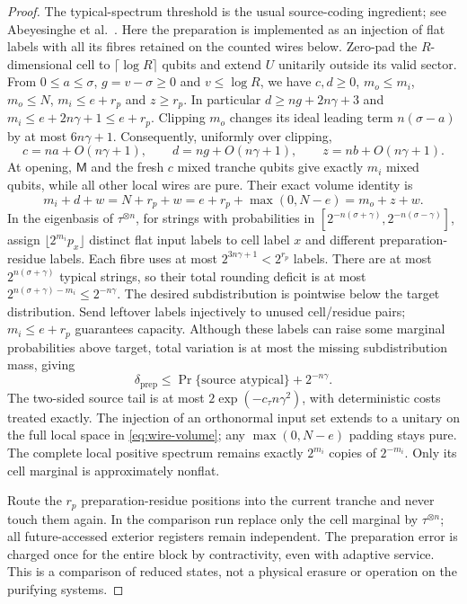 \documentclass[11pt,a4paper]{article}
\numberwithin{equation}{section}
\theoremstyle{plain}
\theoremstyle{definition}
\newcommand{\rg}[1]{\mathsf{#1}}
\begin{document}
\begin{proof}
The typical-spectrum threshold is the usual source-coding ingredient; see Abeyesinghe et al.\
\cite[section VII and Appendix A]{Abeyesinghe2009}. Here the preparation is
implemented as an injection of flat labels with all its fibres retained on the
counted wires below. Zero-pad the $R$-dimensional cell to $\lceil\log R\rceil$
qubits and extend $U$ unitarily outside its valid sector. From
$0\le a\le\sigma$, $g=v-\sigma\ge 0$ and $v\le\log R$, we have $c,d\ge 0$,
$m_o\le m_i$, $m_o\le N$, $m_i\le e+r_p$ and $z\ge r_p$. In particular
$d\ge ng+2n\gamma+3$ and $m_i\le e+2n\gamma+1\le e+r_p$. Clipping $m_o$
changes its ideal leading term $n(\sigma-a)$ by at most $6n\gamma+1$.
Consequently, uniformly over clipping,
\[
c=na+O(n\gamma+1),\qquad d=ng+O(n\gamma+1),\qquad z=nb+O(n\gamma+1).
\]
At opening, $\rg{M}$ and the fresh $c$ mixed tranche qubits give exactly $m_i$
mixed qubits, while all other local wires are pure. Their exact volume
identity is
\begin{equation}
\label{eq:wire-volume}
m_i+d+w=N+r_p+w=e+r_p+\max(0,N-e)=m_o+z+w .
\end{equation}
In the eigenbasis of $\tau^{\otimes n}$, for strings with probabilities in
$[2^{-n(\sigma+\gamma)},2^{-n(\sigma-\gamma)}]$, assign
$\lfloor 2^{m_i}p_x\rfloor$ distinct flat input labels to cell label $x$ and
different preparation-residue labels. Each fibre uses at most
$2^{3n\gamma+1}<2^{r_p}$ labels. There are at most $2^{n(\sigma+\gamma)}$
typical strings, so their total rounding deficit is at most
$2^{n(\sigma+\gamma)-m_i}\le 2^{-n\gamma}$. The desired subdistribution is
pointwise below the target distribution. Send leftover labels injectively to
unused cell/residue pairs; $m_i\le e+r_p$ guarantees capacity. Although these
labels can raise some marginal probabilities above target, total variation is
at most the missing subdistribution mass, giving
\[
\delta_{\mathrm{prep}}\le\Pr\{\text{source atypical}\}+2^{-n\gamma}.
\]
The two-sided source tail is at most $2\exp(-c_\tau n\gamma^2)$, with
deterministic costs treated exactly. The injection of an orthonormal input set
extends to a unitary on the full local space in \eqref{eq:wire-volume}; any
$\max(0,N-e)$ padding stays pure. The complete local positive spectrum remains
exactly $2^{m_i}$ copies of $2^{-m_i}$. Only its cell marginal is
approximately nonflat.

Route the $r_p$ preparation-residue positions into the current tranche and
never touch them again. In the comparison run replace only the cell marginal
by $\tau^{\otimes n}$; all future-accessed exterior registers remain
independent. The preparation error is charged once for the entire block by
contractivity, even with adaptive service. This is a comparison of reduced
states, not a physical erasure or operation on the purifying systems.


\end{proof}
\end{document}
